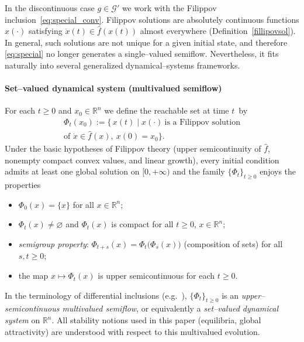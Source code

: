 \documentclass[journal]{IEEEtran}
\theoremstyle{myplain}
\begin{document}
In the discontinuous case $g\in\mathcal{G'}$ we work with the Filippov
inclusion~\eqref{eq:special_conv}. 
Filippov solutions are absolutely continuous functions $x(\cdot)$
satisfying $\dot x(t)\in \hat f(x(t))$ almost everywhere
(Definition~\ref{fillipovsol}). In general, such solutions are not
unique for a given initial state, and therefore \eqref{eq:special} no
longer generates a single–valued semiflow. Nevertheless, it fits
naturally into several generalized dynamical–systems frameworks.

\smallskip
\paragraph*{Set–valued dynamical system (multivalued semiflow)}
For each $t\!\!\ge\!\!0$ and $x_0\!\in\!\mathbb{R}^n$ we define the reachable set
at time $t$~by
\begin{multline}\label{eq:Phi-t}
   \Phi_t(x_0)
   := \bigl\{\,x(t)\;\big|\;x(\cdot)\ \text{is a Filippov solution} \\ 
   \text{of } \dot x\in \hat f(x),\ x(0)=x_0 \bigr\}.
\end{multline}
Under the basic hypotheses of Filippov theory (upper semicontinuity of
$\hat f$, nonempty compact convex values, and linear growth), every initial condition admits at least one global
solution on $[0,+\infty)$ and the family
$\{\Phi_t\}_{t\ge0}$ enjoys the properties
\begin{itemize}
  \item $\Phi_0(x)=\{x\}$ for all $x\in\mathbb{R}^n$;
  \item $\Phi_t(x)\neq\varnothing$ and $\Phi_t(x)$ is compact for all
        $t\ge0$, $x\in\mathbb{R}^n$;
  \item \emph{semigroup property}:
        $\Phi_{t+s}(x)=\Phi_t\bigl(\Phi_s(x)\bigr)$
        (composition of sets) for all $s,t\ge0$;
  \item the map $x\mapsto\Phi_t(x)$ is upper semicontinuous for each
        $t\ge0$.
\end{itemize}
In the terminology of differential inclusions
(e.g.~\cite{Filippov1988,AubinCellina1984,BenaimHofbauerSorin2005}),
$\{\Phi_t\}_{t\ge0}$ is an \emph{upper–semicontinuous multivalued
semiflow}, or equivalently a \emph{set–valued dynamical system} on
$\mathbb{R}^n$. All stability notions used in this paper (equilibria,
global attractivity) are understood with respect to this multivalued
evolution.
\end{document}
